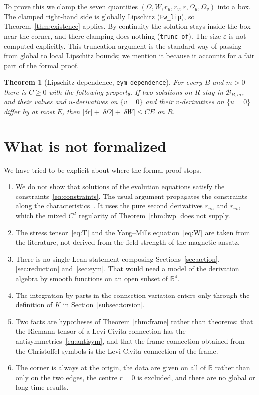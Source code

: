\documentclass[pdflatex,sn-mathphys-num]{sn-jnl}%
\theoremstyle{thmstyleone}%
\newtheorem{theorem}{Theorem}%
\theoremstyle{thmstyletwo}%
\theoremstyle{thmstylethree}%
\newcommand{\lean}[1]{\texttt{#1}}
\newcommand{\R}{\mathbb{R}}
\begin{document}
To prove this we clamp the seven quantities $(\Omega,W,r_u,r_v,r,\Omega_u,\Omega_v)$ into a box. The clamped right-hand side is globally Lipschitz (\lean{Fw\_lip}), so Theorem~\ref{thm:existence} applies. By continuity the solution stays inside the box near the corner, and there clamping does nothing (\lean{trunc\_of}). The size $\varepsilon$ is not computed explicitly. This truncation argument is the standard way of passing from global to local Lipschitz bounds; we mention it because it accounts for a fair part of the formal proof.

\begin{theorem}[Lipschitz dependence, \lean{eym\_dependence}]\label{thm:eymdep}
For every $B$ and $m>0$ there is $C\ge0$ with the following property. If two solutions on $R$ stay in $\mathcal B_{B,m}$, and their values and $u$-derivatives on $\{v=0\}$ and their $v$-derivatives on $\{u=0\}$ differ by at most $E$, then $|\delta r|+|\delta\Omega|+|\delta W|\le CE$ on $R$.
\end{theorem}

\section{What is not formalized}\label{sec:scope}

We have tried to be explicit about where the formal proof stops.
\begin{enumerate}
\item We do not show that solutions of the evolution equations satisfy the constraints~\eqref{eq:constraints}. The usual argument propagates the constraints along the characteristics~\cite{Christodoulou1986,Dafermos2005}. It uses the pure second derivatives $r_{uu}$ and $r_{vv}$, which the mixed $C^2$ regularity of Theorem~\ref{thm:lwp} does not supply.
\item The stress tensor~\eqref{eq:T} and the Yang--Mills equation~\eqref{eq:W} are taken from the literature, not derived from the field strength of the magnetic ansatz.
\item There is no single Lean statement composing Sections~\ref{sec:action}, \ref{sec:reduction} and~\ref{sec:eym}. That would need a model of the derivation algebra by smooth functions on an open subset of $\R^4$.
\item The integration by parts in the connection variation enters only through the definition of $K$ in Section~\ref{subsec:torsion}.
\item Two facts are hypotheses of Theorem~\ref{thm:frame} rather than theorems: that the Riemann tensor of a Levi-Civita connection has the antisymmetries~\eqref{eq:antisym}, and that the frame connection obtained from the Christoffel symbols is the Levi-Civita connection of the frame.
\item The corner is always at the origin, the data are given on all of $\R$ rather than only on the two edges, the centre $r=0$ is excluded, and there are no global or long-time results.
\end{enumerate}
\end{document}
